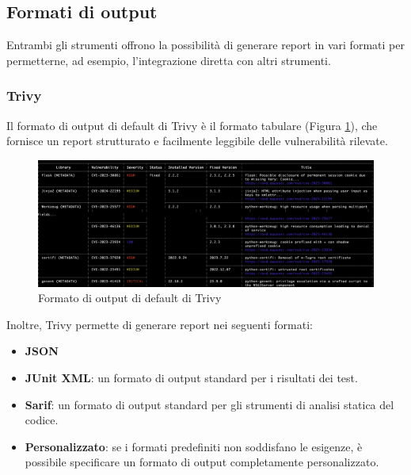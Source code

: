 \subsection{Formati di output}
Entrambi gli strumenti offrono la possibilità di generare report in vari formati per permetterne, ad esempio, l'integrazione diretta con altri strumenti.
\subsubsection{Trivy}
Il formato di output di default di Trivy è il formato tabulare (Figura \ref{fig:trivy_output_fmt}), che fornisce un report strutturato e facilmente leggibile delle vulnerabilità rilevate.
\begin{figure}[H]
   \centering
   \includegraphics[width=1\textwidth]{immagini/capitolo2/trivy_output_fmt.png}
   \caption{Formato di output di default di Trivy}
   \label{fig:trivy_output_fmt}
\end{figure}
Inoltre, Trivy permette di generare report nei seguenti formati:
\begin{itemize}
   \item \textbf{JSON}
   \item \textbf{JUnit XML}: un formato di output standard per i risultati dei test.
   \item \textbf{Sarif}: un formato di output standard per gli strumenti di analisi statica del codice.
   \item \textbf{Personalizzato}: se i formati predefiniti non soddisfano le esigenze, è possibile specificare un formato di output completamente personalizzato.
\end{itemize}

